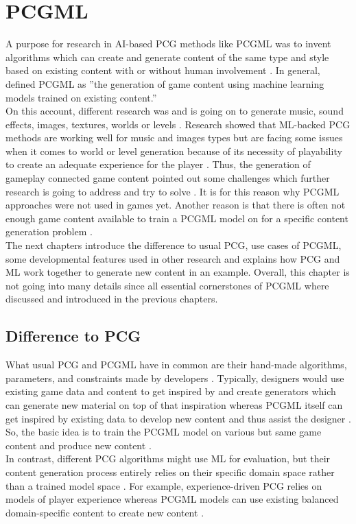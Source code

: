 \documentclass[MGS,Master,english]{twbook}%
\begin{document}
%
%
\clearpage
\chapter{\acl{PCGML}}
A purpose for research in AI-based PCG methods like PCGML was to invent algorithms which can create and generate content of the same type and style based on existing content with or without human involvement \cite{ai::book} \cite{pcgml::paper}. In general, \citep{pcgml::paper} defined PCGML as ''the generation of game content using machine learning models trained on existing content.'' \\
On this account, different research was and is going on to generate music, sound effects, images, textures, worlds or levels \cite{ai::book}. Research showed that ML-backed PCG methods are working well for music and images types but are facing some issues when it comes to world or level generation because of its necessity of playability to create an adequate experience for the player \cite{ai::book}. Thus, the generation of gameplay connected game content pointed out some challenges which further research is going to address and try to solve \cite{ai::book}. It is for this reason why PCGML approaches were not used in games yet. Another reason is that there is often not enough game content available to train a PCGML model on for a specific content generation problem \cite{ai::book}. \\
The next chapters introduce the difference to usual PCG, use cases of PCGML, some developmental features used in other research and explains how PCG and ML work together to generate new content in an example. Overall, this chapter is not going into many details since all essential cornerstones of PCGML where discussed and introduced in the previous chapters.

\section{Difference to \acl{PCG}}
What usual PCG and PCGML have in common are their hand-made algorithms, parameters, and constraints made by developers \cite{pcgml::paper}. Typically, designers would use existing game data and content to get inspired by and create generators which can generate new material on top of that inspiration whereas PCGML itself can get inspired by existing data to develop new content and thus assist the designer \cite{pcgml::paper}. So, the basic idea is to train the PCGML model on various but same game content and produce new content \cite{pcgml::paper}. \\
In contrast, different PCG algorithms might use ML for evaluation, but their content generation process entirely relies on their specific domain space rather than a trained model space \cite{pcgml::paper}. For example, experience-driven PCG relies on models of player experience whereas PCGML models can use existing balanced domain-specific content to create new content \cite{pcgml::paper}.
\end{document}
